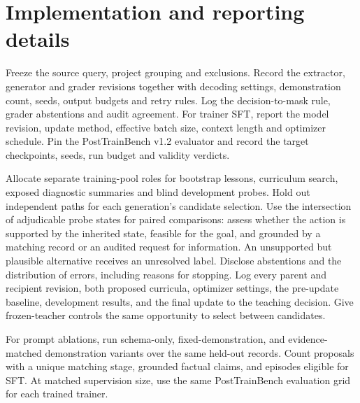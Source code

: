 \section{Implementation and reporting details}

Freeze the source query, project grouping and exclusions. Record the extractor, generator and grader revisions together with decoding settings, demonstration count, seeds, output budgets and retry rules. Log the decision-to-mask rule, grader abstentions and audit agreement. For trainer SFT, report the model revision, update method, effective batch size, context length and optimizer schedule. Pin the PostTrainBench v1.2 evaluator and record the target checkpoints, seeds, run budget and validity verdicts.

Allocate separate training-pool roles for bootstrap lessons, curriculum search, exposed diagnostic summaries and blind development probes. Hold out independent paths for each generation's candidate selection. Use the intersection of adjudicable probe states for paired comparisons: assess whether the action is supported by the inherited state, feasible for the goal, and grounded by a matching record or an audited request for information. An unsupported but plausible alternative receives an unresolved label. Disclose abstentions and the distribution of errors, including reasons for stopping. Log every parent and recipient revision, both proposed curricula, optimizer settings, the pre-update baseline, development results, and the final update to the teaching decision. Give frozen-teacher controls the same opportunity to select between candidates.

For prompt ablations, run schema-only, fixed-demonstration, and evidence-matched demonstration variants over the same held-out records. Count proposals with a unique matching stage, grounded factual claims, and episodes eligible for SFT. At matched supervision size, use the same PostTrainBench evaluation grid for each trained trainer.
